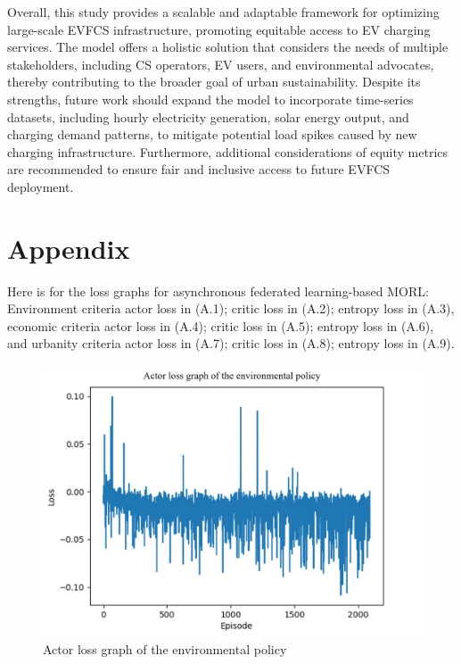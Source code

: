 \documentclass[preprint,12pt]{elsarticle}
\begin{document}
Overall, this study provides a scalable and adaptable framework for optimizing large-scale EVFCS infrastructure, promoting equitable access to EV charging services. The model offers a holistic solution that considers the needs of multiple stakeholders, including CS operators, EV users, and environmental advocates, thereby contributing to the broader goal of urban sustainability. Despite its strengths, future work should expand the model to incorporate time-series datasets, including hourly electricity generation, solar energy output, and charging demand patterns, to mitigate potential load spikes caused by new charging infrastructure. Furthermore, additional considerations of equity metrics are recommended to ensure fair and inclusive access to future EVFCS deployment. 

\newpage
\appendix
\section{Appendix}
\setcounter{figure}{0}
Here is for the loss graphs for asynchronous federated learning-based MORL: Environment criteria actor loss in (A.1); critic loss in (A.2); entropy loss in (A.3), economic criteria actor loss in (A.4); critic loss in (A.5); entropy loss in (A.6), and urbanity criteria actor loss in (A.7); critic loss in (A.8); entropy loss in (A.9).

\begin{figure}[h!]
    \centering
    \includegraphics[width=0.7\linewidth]{paper/doc/result_figure/AFMORL_env_ac_loss_v1.jpg}
    \caption{Actor loss graph of the environmental policy}
    
    \label{fig:enter-label}
\end{figure}
\end{document}

